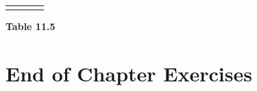 \begin{center}
\begin{xtabular*}{\mytablewidth}[t]{|p{10\mystarwidth}|p{10\mystarwidth}|p{10\mystarwidth}|p{10\mystarwidth}|}
\begin{center}
      \vspace{2pt}
    \vspace{.1in}
    \end{center}    %
     \tabularnewline{}
    \end{xtabular*}
      \end{center}
    \begin{center}{\small\bfseries Table 11.5}\end{center}
    \par
  \label{m39373*cid10}
            \section{ End of Chapter Exercises}
            \nopagebreak
